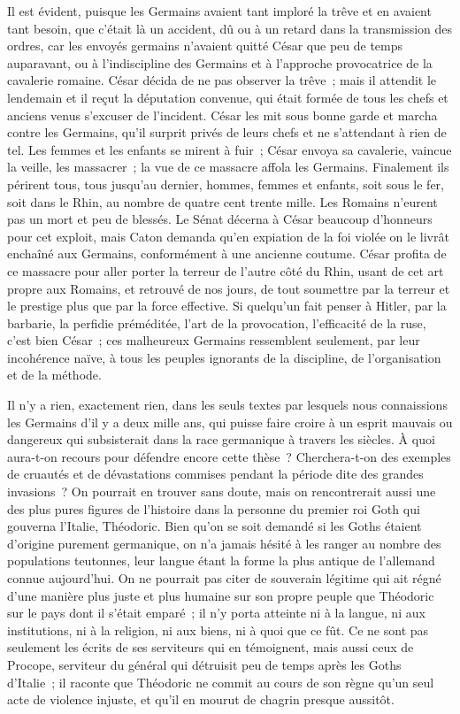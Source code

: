 \documentclass[french,twoside]{book} %
\begin{document}
Il est évident, puisque les Germains avaient tant imploré la trêve et en avaient tant besoin, que c'était là un accident, dû ou à un retard dans la trans­mission des ordres, car les envoyés germains n'avaient quitté César que peu de temps auparavant, ou à l'indiscipline des Germains et à l'approche provoca­trice de la cavalerie romaine. César décida de ne pas observer la trêve ; mais il attendit le lendemain et il reçut la députation convenue, qui était formée de tous les chefs et anciens venus s'excuser de l'incident. César les mit sous bonne garde et marcha contre les Germains, qu'il surprit privés de leurs chefs et ne s'attendant à rien de tel. Les femmes et les enfants se mirent à fuir ; César envoya sa cavalerie, vaincue la veille, les massacrer ; la vue de ce mas­sacre affola les Germains. Finalement ils périrent tous, tous jusqu'au dernier, hommes, femmes et enfants, soit sous le fer, soit dans le Rhin, au nombre de quatre cent trente mille. Les Romains n'eurent pas un mort et peu de blessés. Le Sénat décerna à César beaucoup d'honneurs pour cet exploit, mais Caton demanda qu'en expiation de la foi violée on le livrât enchaîné aux Germains, conformément à une ancienne coutume. César profita de ce massacre pour aller porter la terreur de l'autre côté du Rhin, usant de cet art propre aux Romains, et retrouvé de nos jours, de tout soumettre par la terreur et le prestige plus que par la force effective. Si quelqu'un fait penser à Hitler, par la barbarie, la perfidie préméditée, l'art de la provocation, l'efficacité de la ruse, c'est bien César ; ces malheureux Germains ressemblent seulement, par leur incohérence naïve, à tous les peuples ignorants de la discipline, de l'organi­sation et de la méthode.\par
Il n'y a rien, exactement rien, dans les seuls textes par lesquels nous connaissions les Germains d'il y a deux mille ans, qui puisse faire croire à un esprit mauvais ou dangereux qui subsisterait dans la race germanique à travers les siècles. À quoi aura-t-on recours pour défendre encore cette thèse ? Cherchera-t-on des exemples de cruautés et de dévastations commises pendant la période dite des grandes invasions ? On pourrait en trouver sans doute, mais on rencontrerait aussi une des plus pures figures de l'histoire dans la personne du premier roi Goth qui gouverna l'Italie, Théodoric. Bien qu'on se soit demandé si les Goths étaient d'origine purement germanique, on n'a jamais hésité à les ranger au nombre des populations teutonnes, leur langue étant la forme la plus antique de l'allemand connue aujourd'hui. On ne pourrait pas citer de souverain légitime qui ait régné d'une manière plus juste et plus hu­maine sur son propre peuple que Théodoric sur le pays dont il s'était emparé ; il n'y porta atteinte ni à la langue, ni aux institutions, ni à la religion, ni aux biens, ni à quoi que ce fût. Ce ne sont pas seulement les écrits de ses serviteurs qui en témoignent, mais aussi ceux de Procope, serviteur du général qui détruisit peu de temps après les Goths d'Italie ; il raconte que Théodoric ne commit au cours de son règne qu'un seul acte de violence injuste, et qu'il en mourut de chagrin presque aussitôt.\par
\end{document}
